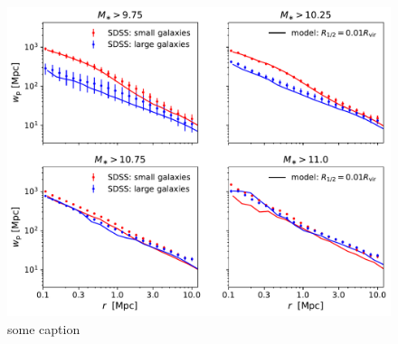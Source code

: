 \documentclass[usenatbib,usegraphicx,letterpaper]{mn2e}
\begin{document}
\begin{figure}
\centering
\includegraphics[width=12cm]{FIGS/rvir_only_wp_large_small_absolute.pdf}
\caption{some caption}
\label{fig:rvir_only_clustering_absolute}
\end{figure}
\end{document}
